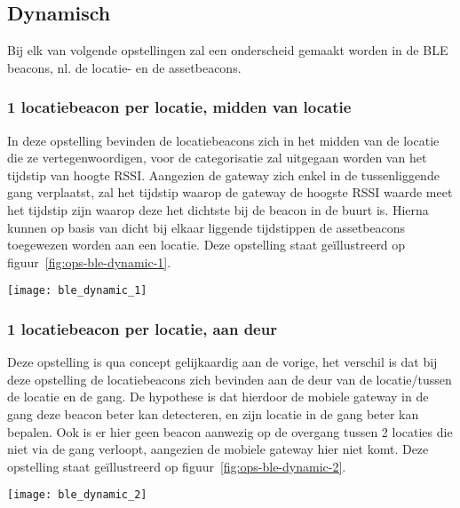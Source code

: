 \subsection{Dynamisch}
Bij elk van volgende opstellingen zal een onderscheid gemaakt worden in de BLE beacons, nl. de locatie- en de assetbeacons.

\subsubsection{1 locatiebeacon per locatie, midden van locatie}
\begin{minipage}{0.65\textwidth}
In deze opstelling bevinden de locatiebeacons zich in het midden van de locatie die ze vertegenwoordigen, voor de categorisatie zal uitgegaan worden van het tijdstip van hoogte RSSI. Aangezien de gateway zich enkel in de tussenliggende gang verplaatst, zal het tijdstip waarop de gateway de hoogste RSSI waarde meet het tijdstip zijn waarop deze het dichtste bij de beacon in de buurt is. Hierna kunnen op basis van dicht bij elkaar liggende tijdstippen de assetbeacons toegewezen worden aan een locatie. Deze opstelling staat geïllustreerd op figuur~\ref{fig:ops-ble-dynamic-1}.
\end{minipage}
\hfill
\begin{minipage}{0.30\textwidth}
	\texttt{[image: ble\_dynamic\_1]}
	\label{fig:ops-ble-dynamic-1}
\end{minipage}

\subsubsection{1 locatiebeacon per locatie, aan deur}
\begin{minipage}{0.65\textwidth}
Deze opstelling is qua concept gelijkaardig aan de vorige, het verschil is dat bij deze opstelling de locatiebeacons zich bevinden aan de deur van de locatie/tussen de locatie en de gang. De hypothese is dat hierdoor de mobiele gateway in de gang deze beacon beter kan detecteren, en zijn locatie in de gang beter kan bepalen. Ook is er hier geen beacon aanwezig op de overgang tussen 2 locaties die niet via de gang verloopt, aangezien de mobiele gateway hier niet komt. Deze opstelling staat geïllustreerd op figuur~\ref{fig:ops-ble-dynamic-2}.
\end{minipage}
\hfill
\begin{minipage}{0.30\textwidth}
	\texttt{[image: ble\_dynamic\_2]}
	\label{fig:ops-ble-dynamic-2}
\end{minipage}

